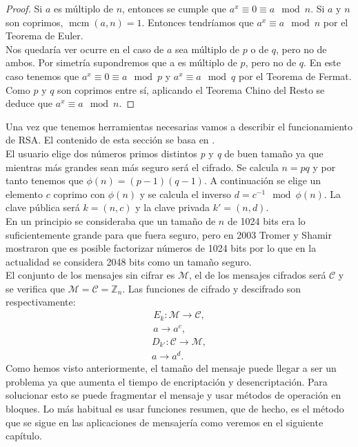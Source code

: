 	\begin{proof}
		Si $a$ es múltiplo de $n$, entonces se cumple que $a^x \equiv 0 \equiv a \mod n$. Si $a$ y $n$ son coprimos, $\operatorname{mcm}(a,n) = 1$. Entonces tendríamos que $a^x \equiv a \mod n$ por el Teorema de Euler.\\
		Nos quedaría ver ocurre en el caso de $a$ sea múltiplo de $p$ o de $q$, pero no de ambos. Por simetría supondremos que a es múltiplo de $p$, pero no de $q$. En este caso tenemos que $a^x \equiv 0 \equiv a \mod p$  y $a^x \equiv a \mod q$ por el Teorema de Fermat. Como $p$ y $q$ son coprimos entre sí, aplicando el Teorema Chino del Resto se deduce que $a^x \equiv a \mod n$.\qedhere
	\end{proof}

Una vez que tenemos herramientas necesarias vamos a describir el funcionamiento de RSA. El contenido de esta sección se basa en \cite{angelRiosMateos}.\\
El usuario elige dos números primos distintos \emph{p} y \emph{q} de buen tamaño ya que mientras más grandes sean más seguro será el cifrado.
Se calcula $n = pq$ y por tanto tenemos que $\phi(n) = (p-1)(q-1)$. A continuación se elige un elemento $c$ coprimo con $\phi(n)$ y se calcula el inverso $d = c^{-1}\mod \phi(n)$. La clave pública será $k=(n,c)$ y la clave privada $k'=(n,d)$.\\
En un principio se consideraba que un tamaño de $n$ de 1024 bits era lo suficientemente grande para que fuera seguro, pero en 2003 Tromer y Shamir mostraron que es posible factorizar números de 1024 bits \cite{1024RSA} por lo que en la actualidad se considera 2048 bits como un tamaño seguro.\\
El conjunto de los mensajes sin cifrar es $\mathcal{M}$, el de los mensajes cifrados será $\mathcal{C}$ y se verifica que $\mathcal{M} = \mathcal{C} = \mathbb{Z}_n$. Las funciones de cifrado y descifrado son respectivamente:
\begin{align*}
	E_{k}:\mathcal{M}\rightarrow\mathcal{C},\\
	a \rightarrow a^c,
\end{align*}
\begin{align*}
	D_{k'}:\mathcal{C}\rightarrow\mathcal{M},\\
	a \rightarrow a^d.
\end{align*}
Como hemos visto anteriormente, el tamaño del mensaje puede llegar a ser un problema ya que aumenta el tiempo de encriptación y desencriptación. Para solucionar esto se puede fragmentar el mensaje y usar métodos de operación en bloques. Lo más habitual es usar funciones resumen, que de hecho, es el método que se sigue en las aplicaciones de mensajería como veremos en el siguiente capítulo.\\
